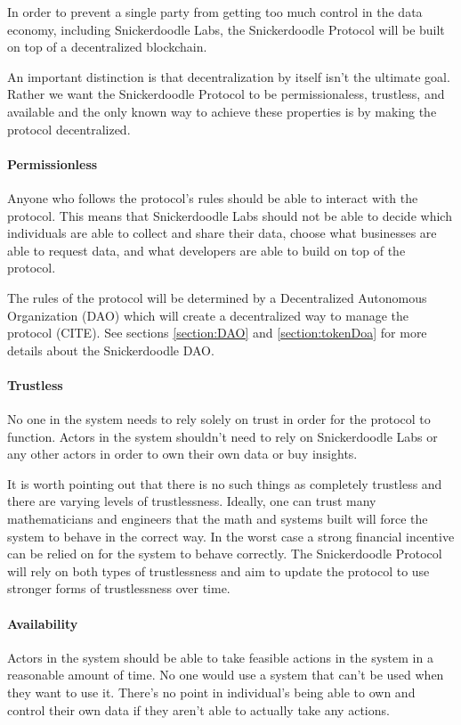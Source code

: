 In order to prevent a single party from getting too much control in the data economy, including Snickerdoodle Labs, the Snickerdoodle Protocol will be built on top of a decentralized blockchain. 

An important distinction is that decentralization by itself isn't the ultimate goal. Rather we want the Snickerdoodle Protocol to be permissionaless, trustless, and available and the only known way to achieve these properties is by making the protocol decentralized.

\paragraph{Permissionless}
Anyone who follows the protocol's rules should be able to interact with the protocol. This means that Snickerdoodle Labs should not be able to decide which individuals are able to collect and share their data, choose what businesses are able to request data, and what developers are able to build on top of the protocol. 

The rules of the protocol will be determined by a Decentralized Autonomous Organization (DAO) which will create a decentralized way to manage the protocol (CITE). See sections \ref{section:DAO} and \ref{section:tokenDoa} for more details about the Snickerdoodle DAO.

\paragraph{Trustless}
No one in the system needs to rely solely on trust in order for the protocol to function.  Actors in the system shouldn't need to rely on Snickerdoodle Labs or any other actors in order to own their own data or buy insights.

It is worth pointing out that there is no such things as completely trustless and there are varying levels of trustlessness. Ideally, one can trust many mathematicians and engineers that the math and systems built will force the system to behave in the correct way. In the worst case a strong financial incentive can be relied on for the system to behave correctly. The Snickerdoodle Protocol will rely on both types of trustlessness and aim to update the protocol to use stronger forms of trustlessness over time.

\paragraph{Availability}
Actors in the system should be able to take feasible actions in the system in a reasonable amount of time. No one would use a system that can't be used when they want to use it. There's no point in individual's being able to own and control their own data if they aren't able to actually take any actions. 

